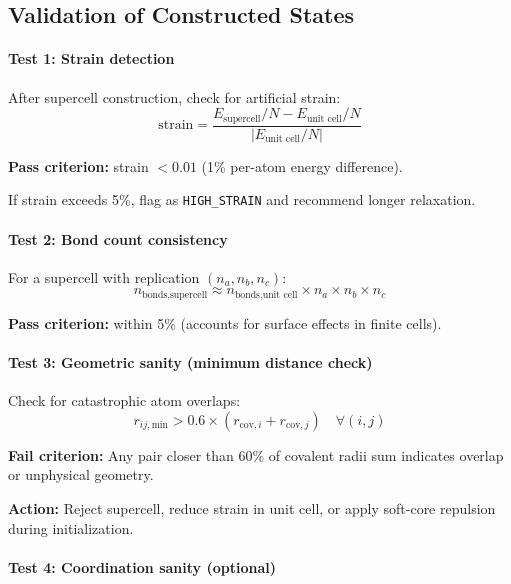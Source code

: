 \documentclass[11pt]{article}
\begin{document}
\subsection{Validation of Constructed States}

\paragraph{Test 1: Strain detection}

After supercell construction, check for artificial strain:
\begin{equation}
\text{strain} = \frac{E_{\text{supercell}}/N - E_{\text{unit cell}}/N}{|E_{\text{unit cell}}/N|}
\end{equation}

\textbf{Pass criterion:} strain $< 0.01$ (1\% per-atom energy difference).

If strain exceeds 5\%, flag as \texttt{HIGH\_STRAIN} and recommend longer relaxation.

\paragraph{Test 2: Bond count consistency}

For a supercell with replication $(n_a, n_b, n_c)$:
\begin{equation}
n_{\text{bonds,supercell}} \approx n_{\text{bonds,unit cell}} \times n_a \times n_b \times n_c
\end{equation}

\textbf{Pass criterion:} within 5\% (accounts for surface effects in finite cells).

\paragraph{Test 3: Geometric sanity (minimum distance check)}

Check for catastrophic atom overlaps:
\begin{equation}
r_{ij,\text{min}} > 0.6 \times (r_{\text{cov},i} + r_{\text{cov},j}) \quad \forall (i,j)
\end{equation}

\textbf{Fail criterion:} Any pair closer than 60\% of covalent radii sum indicates overlap or unphysical geometry.

\textbf{Action:} Reject supercell, reduce strain in unit cell, or apply soft-core repulsion during initialization.

\paragraph{Test 4: Coordination sanity (optional)}
\end{document}
